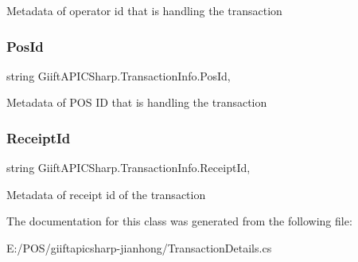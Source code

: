 Metadata of operator id that is handling the transaction 

\mbox{\label{class_giift_a_p_i_c_sharp_1_1_transaction_info_af8d8ffb90d3ca9b52337486d526c1a5d}} 
\subsubsection{\texorpdfstring{Pos\+Id}{PosId}}
{\footnotesize\ttfamily string Giift\+A\+P\+I\+C\+Sharp.\+Transaction\+Info.\+Pos\+Id\hspace{0.3cm}{\ttfamily [get]}, {\ttfamily [set]}}



Metadata of P\+OS ID that is handling the transaction 

\mbox{\label{class_giift_a_p_i_c_sharp_1_1_transaction_info_a7b71bf0dd9d75193538b8dc76e9426c9}} 
\subsubsection{\texorpdfstring{Receipt\+Id}{ReceiptId}}
{\footnotesize\ttfamily string Giift\+A\+P\+I\+C\+Sharp.\+Transaction\+Info.\+Receipt\+Id\hspace{0.3cm}{\ttfamily [get]}, {\ttfamily [set]}}



Metadata of receipt id of the transaction 



The documentation for this class was generated from the following file\+:\begin{DoxyCompactItemize}
\item 
E\+:/\+P\+O\+S/giiftapicsharp-\/jianhong/Transaction\+Details.\+cs\end{DoxyCompactItemize}
